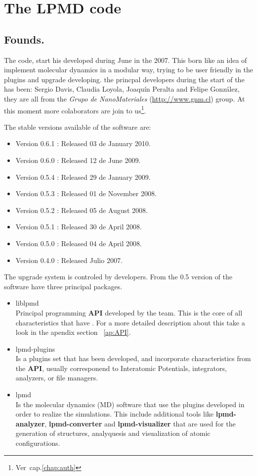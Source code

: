 \chapter{The LPMD code}
\label{chap:lpmd}

\section{Founds.}

The {\lpmd} code, start his developed during June in the 2007. This born like
an idea of implement molecular dynamics in a modular way, trying to be
user friendly  in the plugins and upgrade developing. the princpal developers
during the start of the has been: Sergio Davis, Claudia Loyola, Joaqu\'in
Peralta and Felipe Gonz\'alez, they are all from the \textit{Grupo de
NanoMateriales} (\url{http://www.gnm.cl}) group. At this moment more
colaborators are join to us\footnote{Ver~cap.\ref{chap:auth}}.

The stable versions available of the software are:

\begin{itemize}
 \item Version 0.6.1 : Released 03 de January 2010.
 \item Version 0.6.0 : Released 12 de June 2009.
 \item Version 0.5.4 : Released 29 de January 2009.
 \item Version 0.5.3 : Released 01 de November 2008.
 \item Version 0.5.2 : Released 05 de August 2008.
 \item Version 0.5.1 : Released 30 de April 2008.
 \item Version 0.5.0 : Released 04 de April 2008.
 \item Version 0.4.0 : Released Julio 2007.
\end{itemize}

The upgrade system is controled by developers. From the 0.5 version of {\lpmd}
the software have three principal packages.

\begin{itemize}
 \item liblpmd \\
Principal programming \textbf{API} developed by the team. This is
the core of all characteristics that have {\lpmd}. For a more detailed
description about this take a look in the apendix section ~\ref{ap:API}.
 \item lpmd-plugins \\
Is a plugins set that has been developed, and incorporate characteristics from
the \textbf{API}, usually corresponend to Interatomic Potentials,
integrators, analyzers, or file managers.
 \item lpmd \\
{\lpmd} Is the molecular dynamics (MD) software that use the plugins developed
in order to realize the simulations. This include additional tools
like \textbf{lpmd-analyzer}, \textbf{lpmd-converter} and
\textbf{lpmd-visualizer} that are used for the generation of structures,
analyquesis and visualization of atomic configurations.
\end{itemize}

